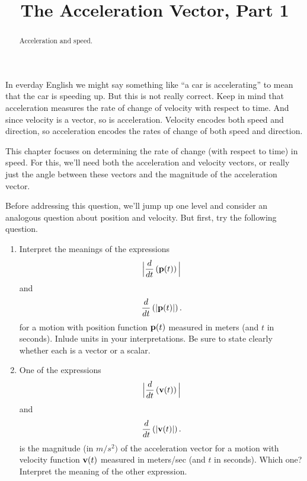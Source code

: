 \documentclass{ximera}
\title{The Acceleration Vector, Part 1}
\begin{document}
\begin{abstract}
Acceleration and speed. 
\end{abstract}
\maketitle

In everday English we might say something like ``a car is accelerating'' to mean that the car is speeding up. But this is not really correct. Keep in mind that acceleration measures the rate of change of velocity with respect to time. And since velocity is a vector, so is acceleration. Velocity encodes both speed and direction, so acceleration encodes the rates of change of both speed and direction.

This chapter focuses on determining the rate of change (with respect to time) in speed. For this, we'll need both the acceleration and velocity vectors, or really just the angle between these vectors and the magnitude of the acceleration vector.

Before addressing this question, we'll jump up one level and consider an analogous question about position and velocity. But first, try the following question.

\begin{question}  \label{Q34r05r34gtt}
\begin{enumerate}
\item Interpret the meanings of the expressions 
\[ 
      \Big| \frac{d}{dt} \left( {\bf p}(t) \right) \Big|
\]
and
\[
   \frac{d}{dt} \left( |{\bf p}(t)| \right) .
\]
for a motion with position function ${\bf p}(t)$ measured in meters (and $t$ in seconds). Inlude units in your interpretations. Be sure to state clearly whether each is a vector or a scalar.

\item One of the expressions 
\[ 
      \Big| \frac{d}{dt} \left( {\bf v}(t) \right) \Big|
\]
and
\[
   \frac{d}{dt} \left( |{\bf v}(t)| \right) .
\]
is the magnitude (in $m/s^2)$ of the acceleration vector for a motion with  velocity function ${\bf v}(t)$ measured in meters/sec (and $t$ in seconds). Which one? Interpret the meaning of the other expression.
 
\end{enumerate}
\begin{freeResponse}
\end{freeResponse}
\end{question}
\end{document}
